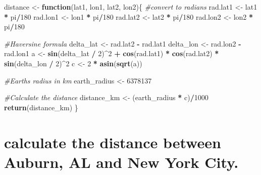 \documentclass[
]{article}
\newenvironment{Shaded}{\begin{snugshade}}{\end{snugshade}}
\newcommand{\CommentTok}[1]{\textcolor[rgb]{0.56,0.35,0.01}{\textit{#1}}}
\newcommand{\ControlFlowTok}[1]{\textcolor[rgb]{0.13,0.29,0.53}{\textbf{#1}}}
\newcommand{\DecValTok}[1]{\textcolor[rgb]{0.00,0.00,0.81}{#1}}
\newcommand{\FunctionTok}[1]{\textcolor[rgb]{0.13,0.29,0.53}{\textbf{#1}}}
\newcommand{\NormalTok}[1]{#1}
\newcommand{\OtherTok}[1]{\textcolor[rgb]{0.56,0.35,0.01}{#1}}
\newcommand{\SpecialCharTok}[1]{\textcolor[rgb]{0.81,0.36,0.00}{\textbf{#1}}}
\begin{document}
\begin{Shaded}
\begin{Highlighting}[]
\NormalTok{distance }\OtherTok{\textless{}{-}} \ControlFlowTok{function}\NormalTok{(lat1, lon1, lat2, lon2)\{}
  \CommentTok{\#convert to radians}
\NormalTok{  rad.lat1 }\OtherTok{\textless{}{-}}\NormalTok{ lat1 }\SpecialCharTok{*}\NormalTok{ pi}\SpecialCharTok{/}\DecValTok{180}
\NormalTok{  rad.lon1 }\OtherTok{\textless{}{-}}\NormalTok{ lon1 }\SpecialCharTok{*}\NormalTok{ pi}\SpecialCharTok{/}\DecValTok{180}
\NormalTok{  rad.lat2 }\OtherTok{\textless{}{-}}\NormalTok{ lat2 }\SpecialCharTok{*}\NormalTok{ pi}\SpecialCharTok{/}\DecValTok{180}
\NormalTok{  rad.lon2 }\OtherTok{\textless{}{-}}\NormalTok{ lon2 }\SpecialCharTok{*}\NormalTok{ pi}\SpecialCharTok{/}\DecValTok{180}
  
  \CommentTok{\#Haversine formula}
\NormalTok{  delta\_lat }\OtherTok{\textless{}{-}}\NormalTok{ rad.lat2 }\SpecialCharTok{{-}}\NormalTok{ rad.lat1}
\NormalTok{  delta\_lon }\OtherTok{\textless{}{-}}\NormalTok{ rad.lon2 }\SpecialCharTok{{-}}\NormalTok{ rad.lon1}
\NormalTok{  a }\OtherTok{\textless{}{-}} \FunctionTok{sin}\NormalTok{(delta\_lat }\SpecialCharTok{/} \DecValTok{2}\NormalTok{)}\SpecialCharTok{\^{}}\DecValTok{2} \SpecialCharTok{+} \FunctionTok{cos}\NormalTok{(rad.lat1) }\SpecialCharTok{*} \FunctionTok{cos}\NormalTok{(rad.lat2) }\SpecialCharTok{*} \FunctionTok{sin}\NormalTok{(delta\_lon }\SpecialCharTok{/} \DecValTok{2}\NormalTok{)}\SpecialCharTok{\^{}}\DecValTok{2}
\NormalTok{  c }\OtherTok{\textless{}{-}} \DecValTok{2} \SpecialCharTok{*} \FunctionTok{asin}\NormalTok{(}\FunctionTok{sqrt}\NormalTok{(a))}
  
  \CommentTok{\#Earth\textquotesingle{}s radius in km}
\NormalTok{  earth\_radius }\OtherTok{\textless{}{-}} \DecValTok{6378137}
  
  \CommentTok{\#Calculate the distance}
\NormalTok{  distance\_km }\OtherTok{\textless{}{-}}\NormalTok{ (earth\_radius }\SpecialCharTok{*}\NormalTok{ c)}\SpecialCharTok{/}\DecValTok{1000}
  \FunctionTok{return}\NormalTok{(distance\_km)}
\NormalTok{\}}
\end{Highlighting}
\end{Shaded}

\section{calculate the distance between Auburn, AL and New York
City.}\label{calculate-the-distance-between-auburn-al-and-new-york-city.}
\end{document}
